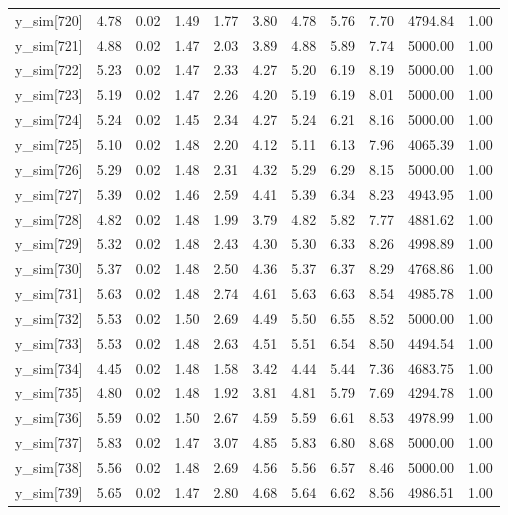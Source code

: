 \begin{table}[ht]
\begin{tabular}{rrrrrrrrrrr}
  y\_sim[720] & 4.78 & 0.02 & 1.49 & 1.77 & 3.80 & 4.78 & 5.76 & 7.70 & 4794.84 & 1.00 \\ 
  y\_sim[721] & 4.88 & 0.02 & 1.47 & 2.03 & 3.89 & 4.88 & 5.89 & 7.74 & 5000.00 & 1.00 \\ 
  y\_sim[722] & 5.23 & 0.02 & 1.47 & 2.33 & 4.27 & 5.20 & 6.19 & 8.19 & 5000.00 & 1.00 \\ 
  y\_sim[723] & 5.19 & 0.02 & 1.47 & 2.26 & 4.20 & 5.19 & 6.19 & 8.01 & 5000.00 & 1.00 \\ 
  y\_sim[724] & 5.24 & 0.02 & 1.45 & 2.34 & 4.27 & 5.24 & 6.21 & 8.16 & 5000.00 & 1.00 \\ 
  y\_sim[725] & 5.10 & 0.02 & 1.48 & 2.20 & 4.12 & 5.11 & 6.13 & 7.96 & 4065.39 & 1.00 \\ 
  y\_sim[726] & 5.29 & 0.02 & 1.48 & 2.31 & 4.32 & 5.29 & 6.29 & 8.15 & 5000.00 & 1.00 \\ 
  y\_sim[727] & 5.39 & 0.02 & 1.46 & 2.59 & 4.41 & 5.39 & 6.34 & 8.23 & 4943.95 & 1.00 \\ 
  y\_sim[728] & 4.82 & 0.02 & 1.48 & 1.99 & 3.79 & 4.82 & 5.82 & 7.77 & 4881.62 & 1.00 \\ 
  y\_sim[729] & 5.32 & 0.02 & 1.48 & 2.43 & 4.30 & 5.30 & 6.33 & 8.26 & 4998.89 & 1.00 \\ 
  y\_sim[730] & 5.37 & 0.02 & 1.48 & 2.50 & 4.36 & 5.37 & 6.37 & 8.29 & 4768.86 & 1.00 \\ 
  y\_sim[731] & 5.63 & 0.02 & 1.48 & 2.74 & 4.61 & 5.63 & 6.63 & 8.54 & 4985.78 & 1.00 \\ 
  y\_sim[732] & 5.53 & 0.02 & 1.50 & 2.69 & 4.49 & 5.50 & 6.55 & 8.52 & 5000.00 & 1.00 \\ 
  y\_sim[733] & 5.53 & 0.02 & 1.48 & 2.63 & 4.51 & 5.51 & 6.54 & 8.50 & 4494.54 & 1.00 \\ 
  y\_sim[734] & 4.45 & 0.02 & 1.48 & 1.58 & 3.42 & 4.44 & 5.44 & 7.36 & 4683.75 & 1.00 \\ 
  y\_sim[735] & 4.80 & 0.02 & 1.48 & 1.92 & 3.81 & 4.81 & 5.79 & 7.69 & 4294.78 & 1.00 \\ 
  y\_sim[736] & 5.59 & 0.02 & 1.50 & 2.67 & 4.59 & 5.59 & 6.61 & 8.53 & 4978.99 & 1.00 \\ 
  y\_sim[737] & 5.83 & 0.02 & 1.47 & 3.07 & 4.85 & 5.83 & 6.80 & 8.68 & 5000.00 & 1.00 \\ 
  y\_sim[738] & 5.56 & 0.02 & 1.48 & 2.69 & 4.56 & 5.56 & 6.57 & 8.46 & 5000.00 & 1.00 \\ 
  y\_sim[739] & 5.65 & 0.02 & 1.47 & 2.80 & 4.68 & 5.64 & 6.62 & 8.56 & 4986.51 & 1.00 \\ 

\end{tabular}
\end{table}
